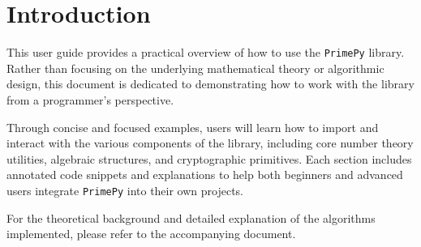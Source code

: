 \section{Introduction}

This user guide provides a practical overview of how to use the \texttt{PrimePy} library. Rather than focusing on the underlying mathematical theory or algorithmic design, this document is dedicated to demonstrating how to work with the library from a programmer’s perspective.

Through concise and focused examples, users will learn how to import and interact with the various components of the library, including core number theory utilities, algebraic structures, and cryptographic primitives. Each section includes annotated code snippets and explanations to help both beginners and advanced users integrate \texttt{PrimePy} into their own projects.

For the theoretical background and detailed explanation of the algorithms implemented, please refer to the accompanying document.
